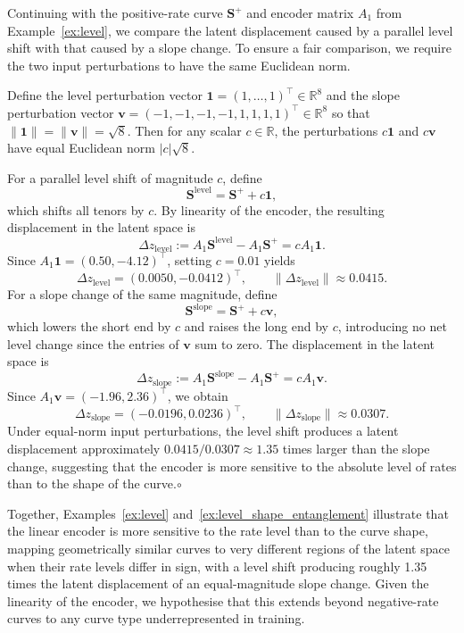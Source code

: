 \begin{example}\label{ex:level_shape_entanglement}
Continuing with the positive-rate curve $\mathbf{S}^{+}$ and encoder matrix $A_1$ 
from Example~\ref{ex:level}, we compare the latent displacement caused by a parallel level shift with that caused by a slope change. To ensure a fair comparison, we require the two input perturbations to have the same Euclidean norm.

Define the level perturbation vector $\mathbf{1} = (1,\ldots,1)^\top \in \mathbb{R}^8$ and the slope perturbation vector $\mathbf{v} = (-1,-1,-1,-1,1,1,1,1)^\top \in \mathbb{R}^8$ so that $\|\mathbf{1}\| = \|\mathbf{v} \| = \sqrt{8}$. Then for any scalar $c \in \mathbb{R}$, the perturbations $c\mathbf{1}$ and $c\mathbf{v} $ have equal Euclidean norm $|c|\sqrt{8}$.

For a parallel level shift of magnitude $c$, define
\[
\mathbf{S}^{\text{level}} = \mathbf{S}^{+} + c\mathbf{1},
\]
which shifts all tenors by $c$. By linearity of the encoder, the resulting 
displacement in the latent space is
\[
\Delta z_{\text{level}} := A_1\mathbf{S}^{\text{level}} - A_1\mathbf{S}^{+} = cA_1\mathbf{1}.
\]
Since $A_1\mathbf{1} = (0.50, -4.12)^\top$, setting $c = 0.01$ yields
\[
\Delta z_{\text{level}} = (0.0050, -0.0412)^\top, \qquad 
\|\Delta z_{\text{level}}\| \approx 0.0415.
\]
For a slope change of the same magnitude, define
\[
\mathbf{S}^{\text{slope}} = \mathbf{S}^{+} + c\mathbf{v} ,
\]
which lowers the short end by $c$ and raises the long end by $c$, introducing no net level change since the entries of $\mathbf{v} $ sum to zero. The displacement 
in the latent space is
\[
\Delta z_{\text{slope}} := A_1\mathbf{S}^{\text{slope}} - A_1\mathbf{S}^{+} = cA_1\mathbf{v} .
\]
Since $A_1\mathbf{v}  = (-1.96, 2.36)^\top$, we obtain
\[
\Delta z_{\text{slope}} = (-0.0196, 0.0236)^\top, \qquad 
\|\Delta z_{\text{slope}}\| \approx 0.0307.
\]
Under equal-norm input perturbations, the level shift produces a latent 
displacement approximately $0.0415 / 0.0307 \approx 1.35$ times larger than 
the slope change, suggesting that the encoder is more sensitive to the absolute level of rates than to the shape of the curve.\;\;$\circ$
\end{example}

Together, Examples~\ref{ex:level} and~\ref{ex:level_shape_entanglement} illustrate that the linear encoder is more sensitive to the rate level than to the curve shape, mapping geometrically similar curves to very different regions of the latent space when their rate levels differ in sign, with a level shift producing roughly 1.35 times the latent displacement of an equal-magnitude slope change. Given the linearity of the encoder, we hypothesise that this extends beyond negative-rate curves to any curve type underrepresented in training.



